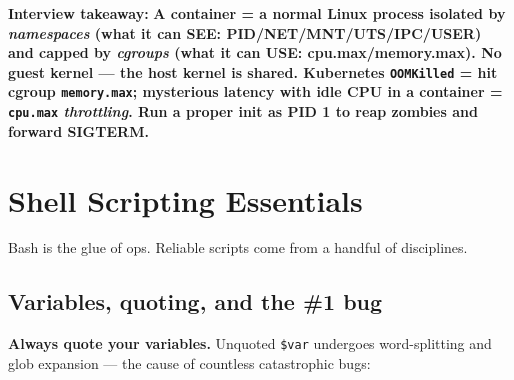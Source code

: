 \documentclass[11pt]{article}
\newenvironment{Shaded}{\begin{snugshade}}{\end{snugshade}}
\newcommand{\AttributeTok}[1]{\textcolor[rgb]{0.16,0.50,0.73}{#1}}
\newcommand{\BuiltInTok}[1]{\textcolor[rgb]{0.50,0.55,0.55}{#1}}
\newcommand{\CommentTok}[1]{\textcolor[rgb]{0.48,0.49,0.49}{#1}}
\newcommand{\FunctionTok}[1]{\textcolor[rgb]{0.56,0.27,0.68}{#1}}
\newcommand{\KeywordTok}[1]{\textcolor[rgb]{0.81,0.81,0.76}{\textbf{#1}}}
\newcommand{\NormalTok}[1]{\textcolor[rgb]{0.81,0.81,0.76}{#1}}
\newcommand{\OperatorTok}[1]{\textcolor[rgb]{0.81,0.81,0.76}{#1}}
\newcommand{\PreprocessorTok}[1]{\textcolor[rgb]{0.15,0.68,0.38}{#1}}
\newcommand{\StringTok}[1]{\textcolor[rgb]{0.96,0.31,0.31}{#1}}
\newcommand{\VariableTok}[1]{\textcolor[rgb]{0.15,0.68,0.68}{#1}}
\begin{document}
\textbf{Interview takeaway:} \textbf{A container = a normal Linux process isolated by \emph{namespaces} (what it can SEE: PID/NET/MNT/UTS/IPC/USER) and capped by \emph{cgroups} (what it can USE: cpu.max/memory.max). No guest kernel --- the host kernel is shared. Kubernetes \texttt{OOMKilled} = hit cgroup \texttt{memory.max}; mysterious latency with idle CPU in a container = \texttt{cpu.max} \emph{throttling}. Run a proper init as PID 1 to reap zombies and forward SIGTERM.}

\section{Shell Scripting Essentials}\label{shell-scripting-essentials}

Bash is the glue of ops. Reliable scripts come from a handful of disciplines.

\subsection{Variables, quoting, and the \#1 bug}\label{variables-quoting-and-the-1-bug}


\begin{Shaded}
\end{Shaded}

\textbf{Always quote your variables.} Unquoted \texttt{\$var} undergoes word-splitting and glob expansion --- the cause of countless catastrophic bugs:


\begin{Shaded}
\end{Shaded}
\end{document}
